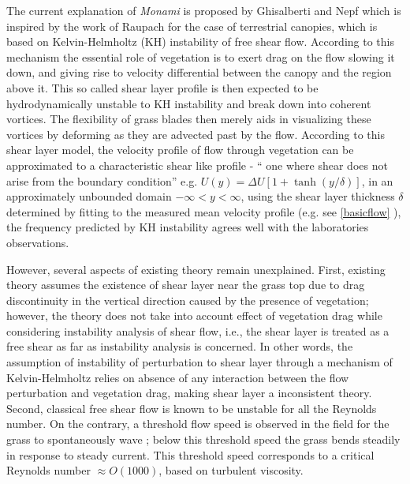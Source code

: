 \documentclass[12pt]{report}   %
\begin{document}
The current explanation of \textit{Monami} is proposed by Ghisalberti and Nepf \cite{Ghisal02,Nepf00} which is inspired by the work of Raupach for the case of terrestrial canopies, which is based on Kelvin-Helmholtz (KH) instability of free shear flow.
According to this mechanism the essential role of vegetation is to exert drag on the flow slowing it down, and giving rise to velocity differential between the canopy and the region above it. This so called shear layer profile is then expected to be hydrodynamically unstable to KH instability and break down into coherent vortices. The flexibility of grass blades then merely aids in visualizing these vortices by deforming as they are advected past by the flow.
According to this shear layer model, the velocity profile of flow through vegetation can be approximated to a characteristic shear like profile - `` one where shear does not arise from the boundary condition'' e.g. $U(y) = \Delta U[1+\tanh(y/\delta)]$, in an approximately unbounded domain $-\infty < y< \infty$, using the shear layer thickness $\delta$ determined by fitting to the measured mean velocity profile (e.g. see \ref{basicflow} ), the frequency predicted by KH instability agrees well with the laboratories observations.

However, several aspects of existing theory remain unexplained. First, existing theory assumes the existence of shear layer near the grass top due to drag discontinuity in the vertical direction caused by the presence of vegetation; however, the theory does not take into account effect of vegetation drag while considering instability analysis of shear flow, i.e., the shear layer is treated as a free shear as far as instability analysis is concerned. In other words, the assumption of instability of perturbation to shear layer through a mechanism of Kelvin-Helmholtz relies on absence of any interaction between the flow perturbation and vegetation drag, making shear layer a inconsistent theory. Second, classical free shear flow is known to be unstable for all the Reynolds number. On the contrary, a threshold flow speed is observed in the field for the grass to spontaneously wave \cite{Grizzle96}; below this threshold speed the grass bends steadily in response to steady current. This threshold speed corresponds 
to a  critical Reynolds number $\approx O(1000)$, based on turbulent viscosity. 
 
\end{document}
